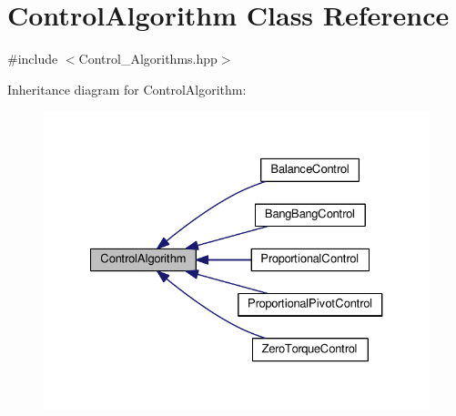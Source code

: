 \hypertarget{classControlAlgorithm}{}\section{Control\+Algorithm Class Reference}
\label{classControlAlgorithm}


{\ttfamily \#include $<$Control\+\_\+\+Algorithms.\+hpp$>$}



Inheritance diagram for Control\+Algorithm\+:\nopagebreak
\begin{figure}[H]
\begin{center}
\leavevmode
\includegraphics[width=327pt]{classControlAlgorithm__inherit__graph}
\end{center}
\end{figure}
